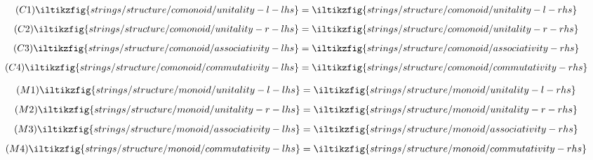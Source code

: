 \begin{figure}
    \centering
    \begin{minipage}{0.3\textwidth}
        \begin{align}
            \tag{\(\mathsf{C1}\)}
            \iltikzfig{strings/structure/comonoid/unitality-l-lhs}
            &=
            \iltikzfig{strings/structure/comonoid/unitality-l-rhs}
            \label{eq:comonoid-unitality-l}
            \\[0.5em]
            \tag{\(\mathsf{C2}\)}
            \iltikzfig{strings/structure/comonoid/unitality-r-lhs}
            &=
            \iltikzfig{strings/structure/comonoid/unitality-r-rhs}
            \label{eq:comonoid-unitality-r}
            \\[0.5em]
            \tag{\(\mathsf{C3}\)}
            \iltikzfig{strings/structure/comonoid/associativity-lhs}
            &=
            \iltikzfig{strings/structure/comonoid/associativity-rhs}
            \label{eq:comonoid-associativity}
            \\[0.5em]
            \tag{\(\mathsf{C4}\)}
            \iltikzfig{strings/structure/comonoid/commutativity-lhs}
            &=
            \iltikzfig{strings/structure/comonoid/commutativity-rhs}
            \label{eq:comonoid-commutativity}
        \end{align}
    \end{minipage}
    \begin{minipage}{0.3\textwidth}
        \begin{align}
            \tag{\(\mathsf{M1}\)}
            \iltikzfig{strings/structure/monoid/unitality-l-lhs}
            &=
            \iltikzfig{strings/structure/monoid/unitality-l-rhs}
            \label{eq:monoid-unitality-l}
            \\[0.5em]
            \tag{\(\mathsf{M2}\)}
            \iltikzfig{strings/structure/monoid/unitality-r-lhs}
            &=
            \iltikzfig{strings/structure/monoid/unitality-r-rhs}
            \label{eq:monoid-unitality-r}
            \\[0.5em]
            \tag{\(\mathsf{M3}\)}
            \iltikzfig{strings/structure/monoid/associativity-lhs}
            &=
            \iltikzfig{strings/structure/monoid/associativity-rhs}
            \label{eq:monoid-associativity}
            \\[0.5em]
            \tag{\(\mathsf{M4}\)}
            \iltikzfig{strings/structure/monoid/commutativity-lhs}
            &=
            \iltikzfig{strings/structure/monoid/commutativity-rhs}

\end{align}
\end{minipage}
\end{figure}
